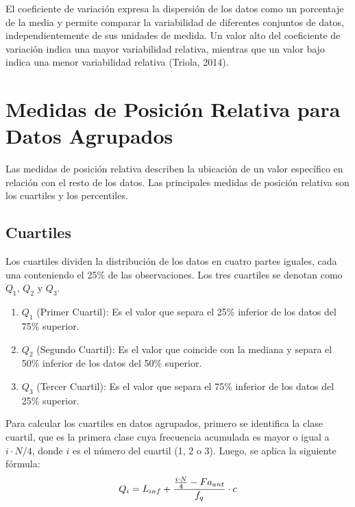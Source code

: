 \documentclass[
  spanish,
  letterpaper,
]{book}
\begin{document}
El coeficiente de variación expresa la dispersión de los datos como un
porcentaje de la media y permite comparar la variabilidad de diferentes
conjuntos de datos, independientemente de sus unidades de medida. Un
valor alto del coeficiente de variación indica una mayor variabilidad
relativa, mientras que un valor bajo indica una menor variabilidad
relativa (Triola, 2014).

\section{Medidas de Posición Relativa para Datos
Agrupados}\label{medidas-de-posiciuxf3n-relativa-para-datos-agrupados}

Las medidas de posición relativa describen la ubicación de un valor
específico en relación con el resto de los datos. Las principales
medidas de posición relativa son los cuartiles y los percentiles.

\subsection{Cuartiles}\label{cuartiles-2}

Los cuartiles dividen la distribución de los datos en cuatro partes
iguales, cada una conteniendo el 25\% de las observaciones. Los tres
cuartiles se denotan como \(Q_1\)\hspace{0pt}, \(Q_2\)\hspace{0pt} y
\(Q_3\)\hspace{0pt}.

\begin{enumerate}
\def\labelenumi{\arabic{enumi}.}
\item
  \(Q_1\)\hspace{0pt} (Primer Cuartil): Es el valor que separa el 25\%
  inferior de los datos del 75\% superior.
\item
  \(Q_2\)\hspace{0pt} (Segundo Cuartil): Es el valor que coincide con la
  mediana y separa el 50\% inferior de los datos del 50\% superior.
\item
  \(Q_3\)\hspace{0pt} (Tercer Cuartil): Es el valor que separa el 75\%
  inferior de los datos del 25\% superior.
\end{enumerate}

Para calcular los cuartiles en datos agrupados, primero se identifica la
clase cuartil, que es la primera clase cuya frecuencia acumulada es
mayor o igual a \(i \cdot N/4\), donde \(i\) es el número del cuartil
(1, 2 o 3). Luego, se aplica la siguiente fórmula:
\[\huge Q_i = L_{inf} + \frac{\frac{i \cdot N}{4} - Fa_{ant}}{f_q} \cdot c\]
\end{document}
